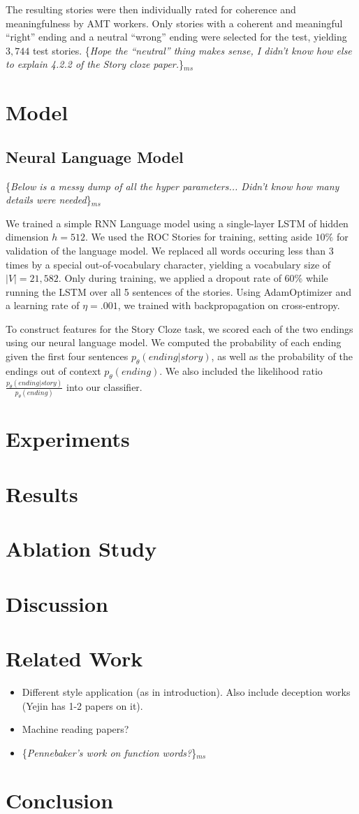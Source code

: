 \documentclass[11pt,a4paper]{article}
\newcommand{\isection}[2]{\section{#1}\label{ssec:#2}}
\newcommand{\isectionb}[1]{\section{#1}\label{ssec:#1}}
\newcommand{\ms}[1]{{\color{cyan}\{\textit{#1}\}$_{ms}$}}
\begin{document}
The resulting stories were then individually rated for coherence and meaningfulness by AMT workers. Only stories with a coherent and meaningful ``right'' ending and a neutral ``wrong'' ending were selected for the test, yielding $3,744$ test stories. \ms{Hope the ``neutral'' thing makes sense, I didn't know how else to explain 4.2.2 of the Story cloze paper.}

\isectionb{Model}

\subsection{Neural Language Model}
\ms{Below is a messy dump of all the hyper parameters... Didn't know how many details were needed}

We trained a simple RNN Language model \cite{mikolov2010recurrent} using a single-layer LSTM \cite{hochreiter1997long} of hidden dimension $h=512$.
We used the ROC Stories for training, setting aside $10\%$ for validation of the language model. We replaced all words occuring less than 3 times by a special out-of-vocabulary character, yielding a vocabulary size of $|V|=21,582$.
Only during training, we applied a dropout rate of 60\% while running the LSTM over all 5 sentences of the stories. Using AdamOptimizer \cite{kingma2014adam} and a learning rate of $\eta=.001$, we trained with backpropagation on cross-entropy. %

To construct features for the Story Cloze task, we scored each of the two endings using our neural language model. We computed the probability of each ending given the first four sentences $p_\theta(ending|story)$, as well as the probability of the endings out of context $p_\theta(ending)$. We also included the likelihood ratio $\frac{p_\theta(ending|story)}{p_\theta(ending)}$ into our classifier.
\isectionb{Experiments}

\isectionb{Results}

\isection{Ablation Study}{Ablation}

\isectionb{Discussion}

\isection{Related Work}{Related}

\begin{itemize}
\item Different style application (as in introduction). Also include deception works (Yejin has 1-2 papers on it). 
\item Machine reading papers? 
\item \ms{Pennebaker's work on function words?}
\end{itemize}


\isectionb{Conclusion}




%
%

\newpage


\end{document}
